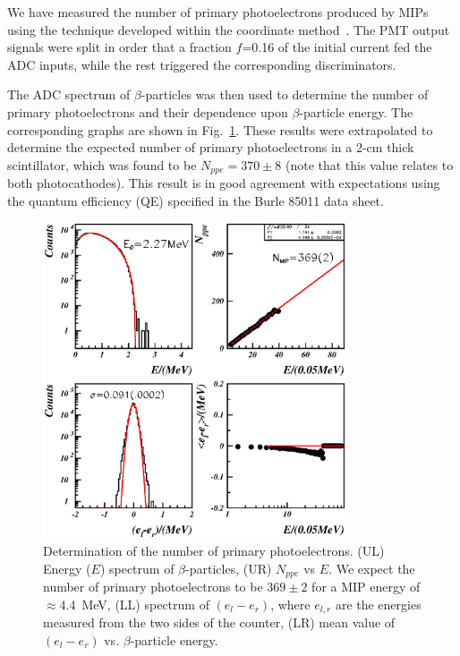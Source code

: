 We have measured the number of primary photoelectrons produced by MIPs using
the technique developed within the coordinate method~\cite{Baturin:2005}.
The PMT output signals were split in order that a fraction $f$=0.16 of 
the initial current fed the ADC inputs, while the rest triggered the 
corresponding discriminators.
 
The ADC spectrum of $\beta$-particles was then used to determine the number 
of primary photoelectrons and their dependence upon $\beta$-particle energy.  
The corresponding graphs are shown in Fig.~\ref{mcpnppe85011}.  These
results were extrapolated to determine the expected number of primary
photoelectrons in a 2-cm thick scintillator, which was found to be 
$N_{ppe}=370\pm8$ (note that this value relates to both photocathodes). This
result is in good agreement with expectations using the quantum efficiency
(QE) specified in the Burle 85011 data sheet. 

\begin{figure}[htbp]
\centering
\includegraphics[width=0.8\textwidth]{enppe_picture13.ps}
\caption{\small{Determination of the number of primary photoelectrons.  (UL) 
Energy ($E$) spectrum of $\beta$-particles, (UR) $N_{ppe}$ vs $E$.  We 
expect the number of primary photoelectrons to be $369 \pm 2$ for a MIP 
energy of $\approx$4.4~MeV, (LL) spectrum of $(e_l-e_r)$, where $e_{l,r}$ are 
the energies measured from the two sides of the counter, (LR) mean value of 
$(e_l-e_r)$ vs. $\beta$-particle energy.}}
\label{mcpnppe85011}
\end{figure}

